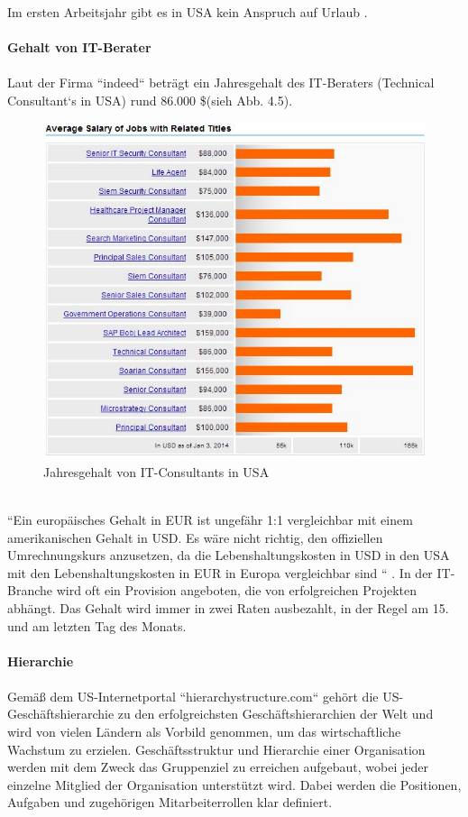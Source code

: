 		Im ersten Arbeitsjahr gibt es in USA kein Anspruch auf Urlaub \cite{USA_Tipps}.
		\\ \\
	\textbf{Gehalt von IT-Berater}\\
		\\
		Laut der Firma ``indeed`` beträgt ein Jahresgehalt des IT-Beraters (Technical Consultant`s in USA) rund 86.000 \$(sieh Abb. 4.5).
		\begin{figure}[ht]
				\centering
				\includegraphics[width=0.7\linewidth]{./images/Techn_Cons_Sal}
				\caption{Jahresgehalt von IT-Consultants in USA}
				\label{fig:TechConsSal}
				\end{figure}\\
		``Ein europäisches Gehalt in EUR ist ungefähr 1:1 vergleichbar mit einem 
		amerikanischen Gehalt in USD. Es wäre nicht richtig, den offiziellen Umrechnungskurs anzusetzen, da die Lebenshaltungskosten in USD in den USA mit den Lebenshaltungskosten in EUR in Europa vergleichbar sind	`` \cite{InfoUSArbVertr}. In der IT-Branche wird oft ein Provision angeboten, die von erfolgreichen 
		Projekten abhängt. Das Gehalt wird immer in zwei Raten ausbezahlt, in der Regel am 15. und am letzten Tag des Monats.\\ \\
	\textbf{Hierarchie} \\ \\
	Gemäß dem US-Internetportal ``hierarchystructure.com`` \cite{HierarchieUSA} gehört die US- Geschäftshierarchie zu den erfolgreichsten Geschäftshierarchien der Welt und wird von vielen Ländern als Vorbild genommen, um das wirtschaftliche Wachstum zu erzielen. Geschäftsstruktur und Hierarchie einer Organisation werden mit dem Zweck das Gruppenziel zu erreichen aufgebaut, wobei jeder einzelne Mitglied der Organisation unterstützt wird. Dabei werden die Positionen, Aufgaben und zugehörigen Mitarbeiterrollen klar definiert.
